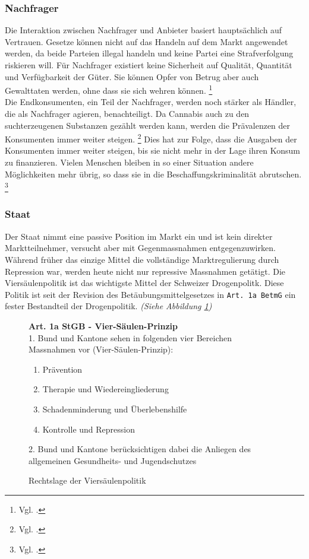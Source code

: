 \documentclass[../main.tex]{subfiles}
\begin{document}
	
	\subsubsection{Nachfrager}
	Die Interaktion zwischen Nachfrager und Anbieter basiert hauptsächlich auf Vertrauen.
	Gesetze können nicht auf das Handeln auf dem Markt angewendet werden, da beide Parteien illegal handeln und keine Partei eine Strafverfolgung riskieren will.
	Für Nachfrager existiert keine Sicherheit auf Qualität, Quantität und Verfügbarkeit der Güter.
	Sie können Opfer von Betrug aber auch Gewalttaten werden, ohne dass sie sich wehren können.%
	\footnote{Vgl. \cite{departmentofjustice-1994}.}\\
	
	\noindent	
	Die Endkonsumenten, ein Teil der Nachfrager, werden noch stärker als Händler, die als Nachfrager agieren, benachteiligt.
	Da Cannabis auch zu den suchterzeugenen Substanzen gezählt werden kann, werden die Prävalenzen der Konsumenten immer weiter steigen.%
	\footnote{Vgl. \cite{becker}.}
	Dies hat zur Folge, dass die Ausgaben der Konsumenten immer weiter steigen, bis sie nicht mehr in der Lage ihren Konsum zu finanzieren.
	Vielen Menschen bleiben in so einer Situation andere Möglichkeiten mehr übrig, so dass sie in die Beschaffungskriminalität abrutschen.%
	\footnote{Vgl. \cite{departmentofjustice-1994}.}
	
	
	\subsubsection{Staat}
	Der Staat nimmt eine passive Position im Markt ein und ist kein direkter Marktteilnehmer, versucht aber mit Gegenmassnahmen entgegenzuwirken.
	Während früher das einzige Mittel die vollständige Marktregulierung durch Repression war, werden heute nicht nur repressive Massnahmen getätigt.
	Die Viersäulenpolitik ist das wichtigste Mittel der Schweizer Drogenpolitk.
	Diese Politik ist seit der Revision des Betäubungsmittelgesetzes in \texttt{Art. 1a BetmG} ein fester Bestandteil der Drogenpolitik.
	\textit{(Siehe Abbildung \ref{fig:stgb-art-1a})}
	
	\begin{figure}[H]
	\begin{tcolorbox}
		\small
	 	\textbf{Art. 1a StGB - Vier-Säulen-Prinzip}\\[7pt]
	 	1. \quad Bund und Kantone sehen in folgenden vier Bereichen Massnahmen vor (Vier-Säulen-Prinzip):
		\begin{enumerate}[label=\alph*.]
			\item Prävention
			\item Therapie und Wiedereingliederung
			\item Schadenminderung und Überlebenshilfe
			\item Kontrolle und Repression
		\end{enumerate}
		2. \quad Bund und Kantone berücksichtigen dabei die Anliegen des allgemeinen Gesundheits- und Jugendschutzes
	\end{tcolorbox}	
	\captionsetup{font=small, skip=0pt}
	\caption{Rechtslage der Viersäulenpolitik}
	\label{fig:stgb-art-1a}
	\end{figure}
	 
\end{document}
